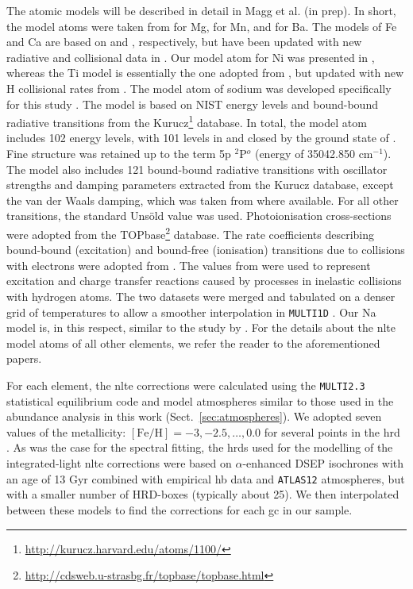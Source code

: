 \documentclass{aa}
\begin{document}
The atomic models will be described in detail in Magg et al. (in prep). In short, the model atoms were taken from \citet{Bergemann2017} for Mg, \citet{Bergemann2019} for Mn, and \citet{Gallagher2020} for Ba.  The models of Fe and Ca are based on \citet{Bergemann2012} and \citet{Mashonkina2007}, respectively, but have been updated with new radiative and collisional data in \citet{Semenova2020}. Our model atom for Ni was presented in \citet{Bergemann2021}, whereas the Ti model is essentially the one adopted from \citet{Bergemann2011}, but updated with new H collisional rates from \citet{Grumer2020}. The model atom of sodium was developed specifically for this study \citep{Moltzer2020}. The model is based on NIST energy levels and bound-bound radiative transitions from the Kurucz\footnote{\url{http://kurucz.harvard.edu/atoms/1100/}} database. In total, the model atom includes 102 energy levels, with 101 levels in  and closed by the ground state of . Fine structure was retained up to the term 5p $^{2}$P$^{o}$ (energy of 35042.850 cm$^{-1}$). The model also includes 121 bound-bound radiative transitions with oscillator strengths and damping parameters extracted from the Kurucz database, except the van der Waals damping, which was taken from \citet{Barklem2000}
where available. For all other transitions, the standard Uns{\"o}ld value was used.  Photoionisation cross-sections were adopted from the TOPbase\footnote{\url{http://cdsweb.u-strasbg.fr/topbase/topbase.html}} database. The rate coefficients describing bound-bound (excitation) and bound-free (ionisation) transitions due to collisions with electrons  were adopted from \citet{Igenbergs2008}. The values from \citet{Barklem2010,Barklem2017} were used to represent excitation and charge transfer reactions caused by processes in inelastic collisions with hydrogen atoms. The two datasets were merged and tabulated on a denser grid of temperatures to allow a smoother interpolation in \texttt{MULTI1D} \citep{Carlsson1986}. Our Na model is, in this respect, similar to the study by \citet{Lind2011}. For the details about the \ac{nlte} model atoms of all other elements, we refer the reader to the aforementioned papers.

For each element, the \ac{nlte} corrections were calculated using the \texttt{MULTI2.3} statistical equilibrium code \citep{Carlsson1986} and model atmospheres similar to those used in the abundance analysis in this work (Sect.~\ref{sec:atmospheres}). We adopted seven values of the metallicity: $\mathrm{[Fe/H]}=-3, -2.5, \ldots, 0.0$ for several points in the \ac{hrd} \citep{Eitner2019}. As was the case for the spectral fitting, the \acp{hrd} used for the modelling of the integrated-light \ac{nlte} corrections were based on $\alpha$-enhanced DSEP isochrones with an age of 13 Gyr combined with empirical \ac{hb} data and \texttt{ATLAS12} atmospheres, but with a smaller number of HRD-boxes (typically about 25). We then interpolated between these models to find the corrections for each \ac{gc} in our sample. 
\end{document}
